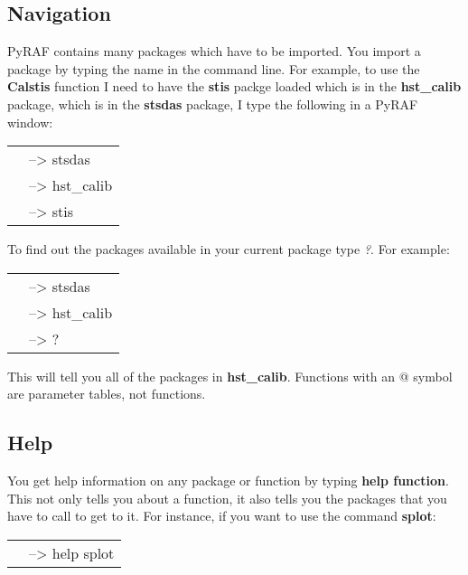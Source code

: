 \subsection{Navigation}
PyRAF contains many packages which have to be imported. You import a package by typing the name in the command line. For example, to use the {\bf Calstis} function I need to have the {\bf stis} packge loaded which is in the {\bf hst\_calib} package, which is in the {\bf stsdas} package,  I type the following in a PyRAF window:

\begin{minipage}{4in}
\setlength{\oddsidemargin}{0.25 in}
\setlength{\evensidemargin}{0.25 in}
\begin{tabular}{ll}
& {\color{RoyalBlue}--> stsdas}\\
& {\color{RoyalBlue}--> hst\_calib}\\
&{\color{RoyalBlue}--> stis}\\
\end{tabular}
\end{minipage}

To find out the packages available in your current package type \emph{?}. For example:

\begin{minipage}{4in}
\setlength{\oddsidemargin}{0.25 in}
\setlength{\evensidemargin}{0.25 in}
\begin{tabular}{ll}
& {\color{RoyalBlue}--> stsdas}\\
& {\color{RoyalBlue}--> hst\_calib}\\
& {\color{RoyalBlue}--> ?}\\
\end{tabular}
\end{minipage}

This will tell you all of the packages in {\bf hst\_calib}. Functions with an @ symbol are parameter tables, not functions.

\subsection{Help}
You get help information on any package or function by typing {\bf help function}. This not only tells you about a function, it also tells you the packages that you have to call to get to it. For instance, if you want to use the command {\bf splot}:

\begin{minipage}{4in}
\setlength{\oddsidemargin}{0.25 in}
\setlength{\evensidemargin}{0.25 in}
\begin{tabular}{ll}
& {\color{RoyalBlue}--> help splot}
\end{tabular}
\end{minipage}

